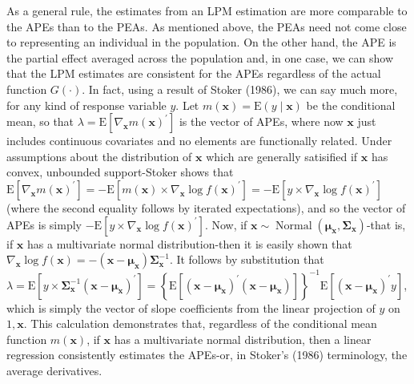 \documentclass[10pt]{article}
\begin{document}
As a general rule, the estimates from an LPM estimation are more comparable to the APEs than to the PEAs. As mentioned above, the PEAs need not come close to representing an individual in the population. On the other hand, the APE is the partial effect averaged across the population and, in one case, we can show that the LPM estimates are consistent for the APEs regardless of the actual function $G(\cdot)$. In fact, using a result of Stoker (1986), we can say much more, for any kind of response variable $y$. Let $m(\mathbf{x})=\mathrm{E}(y \mid \mathbf{x})$ be the conditional mean, so that $\lambda=\mathrm{E}\left[\nabla_{\mathbf{x}} m(\mathbf{x})^{\prime}\right]$ is the vector of APEs, where now $\mathbf{x}$ just includes continuous covariates and no elements are functionally related. Under assumptions about the distribution of $\mathbf{x}$ which are generally satisified if $\mathbf{x}$ has convex, unbounded support-Stoker shows that $\mathrm{E}\left[\nabla_{\mathbf{x}} m(\mathbf{x})^{\prime}\right]=-\mathrm{E}\left[m(\mathbf{x}) \times \nabla_{\mathbf{x}} \log f(\mathbf{x})^{\prime}\right]=-\mathrm{E}\left[y \times \nabla_{\mathbf{x}} \log f(\mathbf{x})^{\prime}\right]$ (where the second equality follows by iterated expectations), and so the vector of APEs is simply $-\mathrm{E}\left[y \times \nabla_{\mathbf{x}} \log f(\mathbf{x})^{\prime}\right]$. Now, if $\mathbf{x} \sim \operatorname{Normal}\left(\boldsymbol{\mu}_{\mathbf{x}}, \boldsymbol{\Sigma}_{\mathbf{x}}\right)$-that is, if $\mathbf{x}$ has a multivariate normal distribution-then it is easily shown that $\nabla_{\mathbf{x}} \log f(\mathbf{x})=-\left(\mathbf{x}-\boldsymbol{\mu}_{\mathbf{x}}\right) \boldsymbol{\Sigma}_{\mathbf{x}}^{-1}$. It follows by substitution that\\
$\lambda=\mathrm{E}\left[y \times \boldsymbol{\Sigma}_{\mathbf{x}}^{-1}\left(\mathbf{x}-\boldsymbol{\mu}_{\mathbf{x}}\right)^{\prime}\right]=\left\{\mathrm{E}\left[\left(\mathbf{x}-\boldsymbol{\mu}_{\mathbf{x}}\right)^{\prime}\left(\mathbf{x}-\boldsymbol{\mu}_{\mathbf{x}}\right)\right]\right\}^{-1} \mathrm{E}\left[\left(\mathbf{x}-\boldsymbol{\mu}_{\mathbf{x}}\right)^{\prime} y\right]$,\\
which is simply the vector of slope coefficients from the linear projection of $y$ on $1, \mathbf{x}$. This calculation demonstrates that, regardless of the conditional mean function $m(\mathbf{x})$, if $\mathbf{x}$ has a multivariate normal distribution, then a linear regression consistently estimates the APEs-or, in Stoker's (1986) terminology, the average derivatives.
\end{document}
